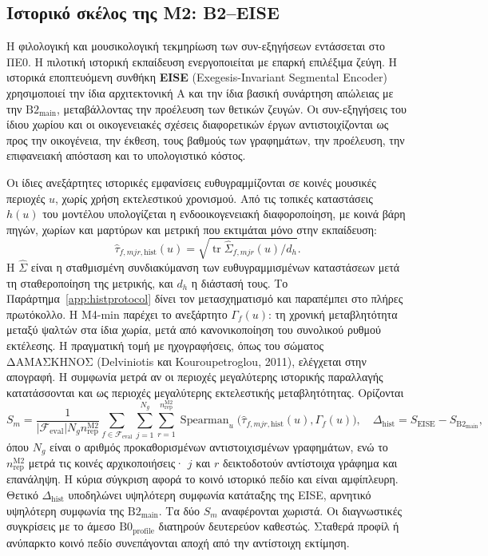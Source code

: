\documentclass[a4paper]{article}
\newcommand{\dhist}{\ensuremath{\Delta_{\mathrm{hist}}}}
\begin{document}
\subsection{Ιστορικό σκέλος της Μ2: B2--EISE}\label{sec:historicpriority}
Η φιλολογική και μουσικολογική τεκμηρίωση των συν-εξηγήσεων εντάσσεται στο ΠΕ0. Η πιλοτική ιστορική εκπαίδευση ενεργοποιείται με επαρκή επιλέξιμα ζεύγη. Η ιστορικά εποπτευόμενη συνθήκη \textbf{EISE} (Exegesis-Invariant Segmental Encoder) χρησιμοποιεί την ίδια αρχιτεκτονική A και την ίδια βασική συνάρτηση απώλειας με την $\mathrm{B2}_{\mathrm{main}}$, μεταβάλλοντας την προέλευση των θετικών ζευγών. Οι συν-εξηγήσεις του ίδιου χωρίου και οι οικογενειακές σχέσεις διαφορετικών έργων αντιστοιχίζονται ως προς την οικογένεια, την έκθεση, τους βαθμούς των γραφημάτων, την προέλευση, την επιφανειακή απόσταση και το υπολογιστικό κόστος.

Οι ίδιες ανεξάρτητες ιστορικές εμφανίσεις ευθυγραμμίζονται σε κοινές μουσικές περιοχές $u$, χωρίς χρήση εκτελεστικού χρονισμού. Από τις τοπικές καταστάσεις $h(u)$ του μοντέλου υπολογίζεται η ενδοοικογενειακή διαφοροποίηση, με κοινά βάρη πηγών, χωρίων και μαρτύρων και μετρική που εκτιμάται μόνο στην εκπαίδευση:
\[
\widehat\tau_{f,mjr,\mathrm{hist}}(u)
=\sqrt{\operatorname{tr}\widehat\Sigma_{f,mjr}(u)/d_h}.
\]
Η $\widehat\Sigma$ είναι η σταθμισμένη συνδιακύμανση των ευθυγραμμισμένων καταστάσεων μετά τη σταθεροποίηση της μετρικής, και $d_h$ η διάστασή τους. Το Παράρτημα~\ref{app:histprotocol} δίνει τον μετασχηματισμό και παραπέμπει στο πλήρες πρωτόκολλο. Η Μ4-min παρέχει το ανεξάρτητο $\Gamma_f(u)$: τη χρονική μεταβλητότητα μεταξύ ψαλτών στα ίδια χωρία, μετά από κανονικοποίηση του συνολικού ρυθμού εκτέλεσης. Η πραγματική τομή με ηχογραφήσεις, όπως του σώματος ΔΑΜΑΣΚΗΝΟΣ (Delviniotis και Kouroupetroglou, 2011), ελέγχεται στην απογραφή. Η συμφωνία μετρά αν οι περιοχές μεγαλύτερης ιστορικής παραλλαγής κατατάσσονται και ως περιοχές μεγαλύτερης εκτελεστικής μεταβλητότητας. Ορίζονται
\[
S_m=\frac{1}{|\mathcal F_{\mathrm{eval}}|N_g n_{\mathrm{rep}}^{\mathrm{M2}}}\sum_{f\in\mathcal F_{\mathrm{eval}}}\sum_{j=1}^{N_g}\sum_{r=1}^{n_{\mathrm{rep}}^{\mathrm{M2}}}\operatorname{Spearman}_{u}\bigl(\widehat\tau_{f,mjr,\mathrm{hist}}(u),\Gamma_f(u)\bigr),\quad \dhist=S_{\mathrm{EISE}}-S_{\mathrm{B2}_{\mathrm{main}}},
\]
όπου $N_g$ είναι ο αριθμός προκαθορισμένων αντιστοιχισμένων γραφημάτων, ενώ το $n_{\mathrm{rep}}^{\mathrm{M2}}$ μετρά τις κοινές αρχικοποιήσεις· $j$ και $r$ δεικτοδοτούν αντίστοιχα γράφημα και επανάληψη. Η κύρια σύγκριση αφορά το κοινό ιστορικό πεδίο και είναι αμφίπλευρη. Θετικό $\dhist$ υποδηλώνει υψηλότερη συμφωνία κατάταξης της EISE, αρνητικό υψηλότερη συμφωνία της $\mathrm{B2}_{\mathrm{main}}$. Τα δύο $S_m$ αναφέρονται χωριστά. Οι διαγνωστικές συγκρίσεις με το άμεσο $\mathrm{B0}_{\mathrm{profile}}$ διατηρούν δευτερεύον καθεστώς. Σταθερά προφίλ ή ανύπαρκτο κοινό πεδίο συνεπάγονται αποχή από την αντίστοιχη εκτίμηση.
\end{document}
